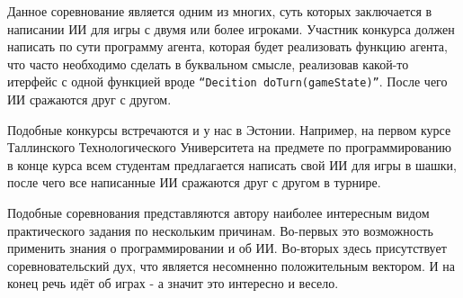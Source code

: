 \documentclass[12pt]{report}
\begin{document}
Данное соревнование является одним из многих, суть которых заключается в написании ИИ для игры с двумя или более игроками. Участник конкурса должен написать по сути программу агента, которая будет реализовать функцию агента, что часто необходимо сделать в буквальном смысле, реализовав какой-то итерфейс с одной функцией вроде \texttt{``Decition doTurn(gameState)''}. После чего ИИ сражаются друг с другом.

Подобные конкурсы встречаются и у нас в Эстонии. Например, на первом курсе Таллинского Технологического Университета на предмете по программированию в конце курса всем студентам предлагается написать свой ИИ для игры в шашки, после чего все написанные ИИ сражаются друг с другом в турнире.

Подобные соревнования представляются автору наиболее интересным видом практического задания по нескольким причинам. Во-первых это возможность применить знания о программировании и об ИИ. Во-вторых здесь присутствует соревновательский дух, что является несомненно положительным вектором. И на конец речь идёт об играх - а значит это интересно и весело.
\end{document}
